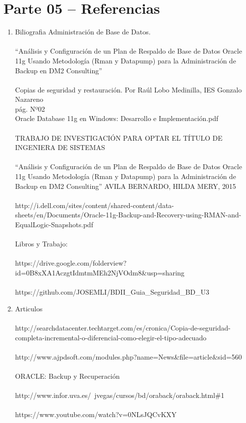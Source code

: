 \section{Parte 05 – Referencias} 

\begin{enumerate}[1.]
	\item Biliografia
	\subitem Administración de Base de Datos.
	\\\\“Análisis y Configuración de un Plan de Respaldo de Base de Datos Oracle 11g Usando Metodología (Rman y Datapump) para la Administración de Backup en DM2 Consulting”
	\\\\Copias de seguridad y restauración. Por Raúl Lobo Medinilla, IES Gonzalo Nazareno
	\\pág. Nº02
	\\Oracle Database 11g en Windows: Desarrollo e Implementación.pdf
	\\\\TRABAJO DE INVESTIGACIÓN PARA OPTAR EL TÍTULO DE INGENIERA DE SISTEMAS
	\\\\“Análisis y Configuración de un Plan de Respaldo de Base de Datos Oracle 11g Usando Metodología (Rman y Datapump) para la Administración de Backup en DM2 Consulting” AVILA BERNARDO, HILDA MERY, 2015
	\\\\http://i.dell.com/sites/content/shared-content/data-sheets/en/Documents/Oracle-11g-Backup-and-Recovery-using-RMAN-and-EqualLogic-Snapshots.pdf
	\\\\Libros y Trabajo: 
	\\\\https://drive.google.com/folderview?id=0B8xXA1AczgtIdmtmMEh2NjVOdm8\&usp=sharing
	\\\\https://github.com/JOSEMLI/BDII\_Guia\_Seguridad\_BD\_U3

	\item Articulos
	\\\\http://searchdatacenter.techtarget.com/es/cronica/Copia-de-seguridad-completa-incremental-o-diferencial-como-elegir-el-tipo-adecuado
	\\\\http://www.ajpdsoft.com/modules.php?name=News\&file=article\&sid=560
	\\\\ORACLE: Backup y Recuperación 
	\\\\http://www.infor.uva.es/~jvegas/cursos/bd/oraback/oraback.html\#1
	\\\\https://www.youtube.com/watch?v=0NLsJQCvKXY
	

\end{enumerate} 
